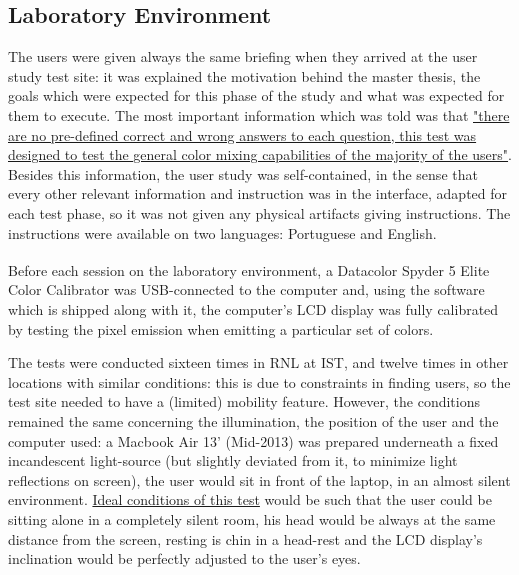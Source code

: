 \subsection{Laboratory Environment}
%
The users were given always the same briefing when they arrived at the user study test site: it was explained the motivation behind the master
thesis, the goals which were expected for this phase of the study and what was expected for them to execute. The most important information which
was told was that \ul{"there are no pre-defined correct and wrong answers to each question, this test was designed to test the general
color mixing capabilities of the majority of the users"}. Besides this information, the user study was self-contained, in the sense that
every other relevant information and instruction was in the interface, adapted for each test phase, so it was not given any physical artifacts
giving instructions. The instructions were available on two languages: Portuguese and English. \par
%
Before each session on the laboratory environment, a Datacolor\textsuperscript{\textregistered} Spyder 5 Elite Color Calibrator was USB-connected to the computer and, using
the software which is shipped along with it, the computer's LCD display was fully calibrated by testing the pixel emission when emitting a particular
set of colors. \par
%
The tests were conducted sixteen times in \gls{RNL} at \gls{IST}, and twelve times in other locations with similar conditions:
this is due to constraints in finding users, so the test site needed to have a (limited) mobility feature. However, the conditions remained
the same concerning the illumination, the position of the user and the computer used: a Macbook Air 13' (Mid-2013) was prepared underneath
a fixed incandescent light-source (but slightly deviated from it, to minimize light reflections on screen), the user would sit in front
of the laptop, in an almost silent environment. \ul{Ideal conditions of this test} would be such that the user could be sitting alone in a completely
silent room, his head would be always at the same distance from the screen, resting is chin in a head-rest and the LCD display's inclination would be perfectly
adjusted to the user's eyes.
%
